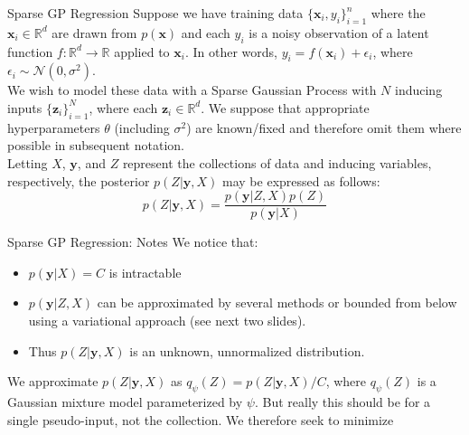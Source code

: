 \documentclass{beamer}
\begin{document}
	
\begin{frame}{Sparse GP Regression}
	Suppose we have training data $\{\mathbf{x}_i,y_i\}_{i=1}^n$ where the $\mathbf{x}_i \in \mathbb{R}^d$ are drawn from $p(\mathbf{x})$ and each $y_i$ is a noisy observation of a latent function $f: \mathbb{R}^d \to \mathbb{R}$ applied to $\mathbf{x}_i$. In other words, $y_i = f(\mathbf{x}_i) + \epsilon_i$, where  $\epsilon_i \sim \mathcal{N}(0,\sigma^2)$.\\
\vspace{1em}
	 We wish to model these data with a Sparse Gaussian Process with $N$ inducing inputs $\{\mathbf{z}_i\}_{i=1}^N$, where each $\mathbf{z}_i \in \mathbb{R}^d$. We suppose that appropriate hyperparameters $\theta$ (including $\sigma^2$) are known/fixed and therefore omit them where possible in subsequent notation.\\
	 \vspace{1em}
	 Letting $X$, $\mathbf{y}$, and $Z$ represent the collections of data and inducing variables, respectively, the posterior $p(Z | \mathbf{y}, X)$ may be expressed as follows:
	 \begin{equation}
	 p(Z | \mathbf{y}, X) = \frac{p(\mathbf{y} | Z, X)p(Z)}{p(\mathbf{y} | X)}
	 \end{equation}
\end{frame}

\begin{frame}{Sparse GP Regression: Notes}
	We notice that:
\begin{itemize}
	\item $p(\mathbf{y} | X) = C$ is intractable
	\item $p(\mathbf{y} | Z, X)$ can be approximated by several methods or bounded from below using a variational approach (see next two slides).
	\item Thus $p(Z|\mathbf{y},X)$ is an unknown, unnormalized distribution.
\end{itemize}
\end{frame}

\begin{frame}
	We approximate $p(Z|\mathbf{y},X)$ as $q_{\psi}(Z) = p(Z|\mathbf{y},X)/C$, where $q_{\psi}(Z)$ is a Gaussian mixture model parameterized by $\psi$. But really this should be for a single pseudo-input, not the collection. We therefore seek to minimize 
\end{frame}
	
\end{document}
